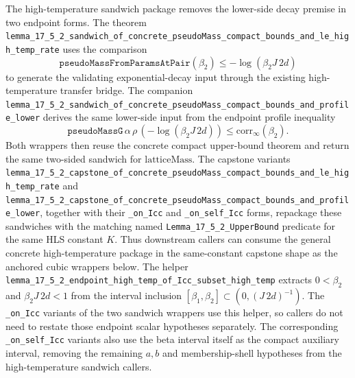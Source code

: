 \documentclass[a4paper,11pt]{article}
\begin{document}
The high-temperature sandwich package removes the lower-side decay premise in
two endpoint forms.  The theorem
\texttt{lemma\_17\_5\_2\_sandwich\_of\_concrete\_pseudoMass\_compact\_bounds\_and\_le\_high\_temp\_rate}
uses the comparison
\[
  \texttt{pseudoMassFromParamsAtPair}(\beta_2)
  \le -\log(\beta_2 J\,2d)
\]
to generate the validating exponential-decay input through the existing
high-temperature transfer bridge.  The companion
\texttt{lemma\_17\_5\_2\_sandwich\_of\_concrete\_pseudoMass\_compact\_bounds\_and\_profile\_lower}
derives the same lower-side input from the endpoint profile inequality
\[
  \texttt{pseudoMassG}\,\alpha\,\rho\,(-\log(\beta_2 J\,2d))
  \le \mathrm{corr}_\infty(\beta_2).
\]
Both wrappers then reuse the concrete compact upper-bound theorem and return
the same two-sided sandwich for \(\mathrm{latticeMass}\).
The capstone variants
\texttt{lemma\_17\_5\_2\_capstone\_of\_concrete\_pseudoMass\_compact\_bounds\_and\_le\_high\_temp\_rate}
and
\texttt{lemma\_17\_5\_2\_capstone\_of\_concrete\_pseudoMass\_compact\_bounds\_and\_profile\_lower},
together with their \texttt{\_on\_Icc} and \texttt{\_on\_self\_Icc} forms,
repackage these sandwiches with the matching named
\texttt{Lemma\_17\_5\_2\_UpperBound} predicate for the same HLS constant
\(K\).  Thus downstream callers can consume the general concrete
high-temperature package in the same-constant capstone shape as the
anchored cubic wrappers below.
The helper
\texttt{lemma\_17\_5\_2\_endpoint\_high\_temp\_of\_Icc\_subset\_high\_temp}
extracts \(0<\beta_2\) and \(\beta_2J\,2d<1\) from the interval inclusion
\([\beta_1,\beta_2]\subset(0,(J\,2d)^{-1})\).  The \texttt{\_on\_Icc}
variants of the two sandwich wrappers use this helper, so callers do not need
to restate those endpoint scalar hypotheses separately.
The corresponding \texttt{\_on\_self\_Icc} variants also use the beta interval
itself as the compact auxiliary interval, removing the remaining \(a,b\) and
membership-shell hypotheses from the high-temperature sandwich callers.
\end{document}
